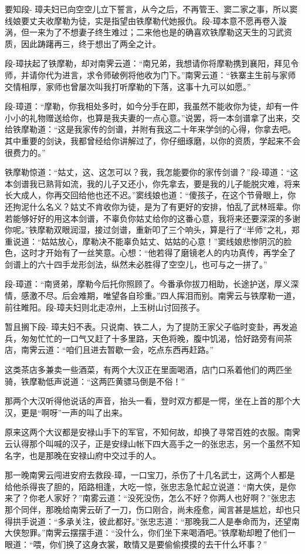\documentclass[12pt,oneside]{book}
\begin{document}
要知段-
璋夫妇已向空空儿立下誓言，从今之后，不再管王、窦二家之事，所以窦线娘要丈夫收摩勒为徒，实是指望由铁摩勒代她报仇。段-璋本意不愿再卷入漩涡，但一来为了不想妻子终生难过；二来他也是的确喜欢铁摩勒这天生的习武资质，因此踌躇再三，终于想出了两全之计。

段-璋扶起了铁摩勒，却对南霁云道：``南兄弟，我想请你将摩勒携到襄阳，拜见令师，并请你代为进言，求令师破例将他收为门下。''南霁云道：``铁寨主生前与家师交情相厚，家师也曾屡次叫我打听摩勒的下落，这事十九可以如愿。''

段-璋道：``摩勒，你我相处多时，如今分手在即，我虽然不能收你为徒，却有一件小小的礼物赠送给你，也算是我夫妻的一点心意。''说罢，将一本剑谱拿了出来，交给铁摩勒道：``这是我家传的剑谱，并附有我这二十年来学剑的心得，你拿去吧。其中重要的剑诀，我都曾经给你讲解过了，你仔细琢磨，以你的资质，学起来不会很费力的。''

铁摩勒惊道：``姑丈，这、这怎可以？我，我怎能要你的家传剑谱？''段-璋道：``这本剑谱我已熟背如流，我的儿子又还小，你先拿去，要是我的儿子能脱灾难，将来长大成人，你再交回给他也还不迟。''窦线娘也道：``傻孩子，在这个节骨眼上，你还拘泥什么名义？姑丈不肯收你为徒，是为了有更好的安排，怕乱了武林班辈。你若能够好好的用这本剑谱，不辜负你姑丈给你的这番心意，我将来还要深深的多谢你呢。''铁摩勒双眼润湿，接过剑谱，重新叩了三个响头，算是行了``半师''之礼，郑重说道：``姑姑放心，摩勒决不能辜负姑丈、姑姑的心意！''窦线娘悲惨阴沉的脸色，这时才开始有了一丝笑意。心想：``他若得了磨镜老人的内功真传，再学全了剑谱上的六十四手龙形剑法，纵然未必胜得了空空儿，也可与之一拼了。''

段-璋道：``南贤弟，摩勒今后托你照顾了。今番承你拔刀相助，长途护送，厚义深情，感激不尽。后会难期，唯望各自珍重。''四人挥泪而别。南霁云与铁摩勒一道，前往睢阳。段-璋夫妇则北走凉州，上玉树山讨回孩子。

暂且搁下段-
璋夫妇不表。只说南、铁二人，为了提防王家父子临时变卦，再发追兵，匆匆忙忙的一口气又赶了十多里路，天色将晚，腹中饥渴，恰好路旁有间茶店，南霁云道：``咱们且进去暂歇一会，吃点东西再赶路。''

这类茶店多兼卖一些酒菜，有两个大汉正在里面喝酒，店门口系着他们的两匹坐骑，铁摩勒低声说道：``这两匹黄骠马倒是不俗！''

那两个大汉听得他说话的声音，抬头一看，登时双方都是一愕，坐在上首的那个大汉，更是``啊呀''一声的叫了出来。

原来这两个大议都是安禄山手下的军官，不知何故，却换了寻常百姓的衣服。南霁云认得那个叫喊的汉子，正是安绿山帐下四大高手之一的张忠志，另一个虽然不知名字，也是那晚在安禄山府中交过手的人。

那一晚南霁云闯进安府去救段-璋，一口宝刀，杀伤了十几名武士，这两个人都是给他杀得丧了胆的，陌路相逢，大吃一惊，张忠志急忙起立说道：``南大侠，是你来了？你老人家好？''南雾云道：``没死没伤，怎么不好？你两人也好啊？''张忠志那个同伴，那晚给南霁云斫了一刀，伤口刚合，尚未痊愈，闻言甚是尴尬，却也只得拱手说道：``多承关注，彼此都好。''张忠志道：``那晚我二人是奉命而为，还望南大侠恕罪。''南霁云摆摆手道：``没什么，你们坐下来喝酒吧。''铁摩勒却瞪了他们一眼道：``喂，你们换了这身衣裳，敢情又是要偷偷摸摸的去干什么坏事？''
\end{document}
